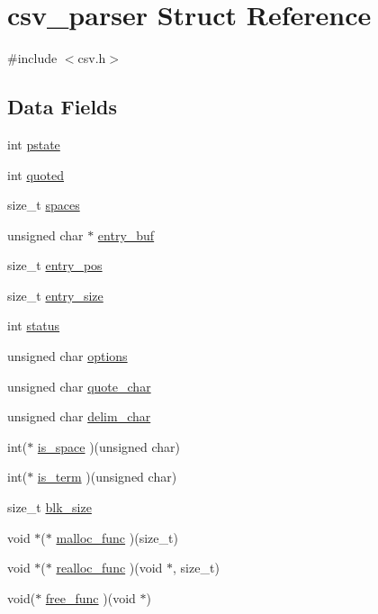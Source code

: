 \hypertarget{structcsv__parser}{}\section{csv\+\_\+parser Struct Reference}
\label{structcsv__parser}


{\ttfamily \#include $<$csv.\+h$>$}

\subsection*{Data Fields}
\begin{DoxyCompactItemize}
\item 
int \hyperlink{structcsv__parser_a57d6eb644698f5567c0511832729881d}{pstate}
\item 
int \hyperlink{structcsv__parser_a17cf94344b659e2d1785109db2028acd}{quoted}
\item 
size\+\_\+t \hyperlink{structcsv__parser_a8285d03865a23548f549a0dafe1639f7}{spaces}
\item 
unsigned char $\ast$ \hyperlink{structcsv__parser_a188bc93ecf5d24ea761c9f152e6e84fb}{entry\+\_\+buf}
\item 
size\+\_\+t \hyperlink{structcsv__parser_a4dafa17fc8952592ad1d7339cec87b0c}{entry\+\_\+pos}
\item 
size\+\_\+t \hyperlink{structcsv__parser_a050339de09565a18f08b217913851295}{entry\+\_\+size}
\item 
int \hyperlink{structcsv__parser_a6e27f49150e9a14580fb313cc2777e00}{status}
\item 
unsigned char \hyperlink{structcsv__parser_aa05f6399318ee41633b822ca07303438}{options}
\item 
unsigned char \hyperlink{structcsv__parser_a065023bbecdc489441e184f5b06463e3}{quote\+\_\+char}
\item 
unsigned char \hyperlink{structcsv__parser_a42bfd1492c290309b8ceca0f42f1901f}{delim\+\_\+char}
\item 
int($\ast$ \hyperlink{structcsv__parser_a84bb1e129be92e0aede2b8f550663e40}{is\+\_\+space} )(unsigned char)
\item 
int($\ast$ \hyperlink{structcsv__parser_a69d7ecb460015723c67157151cdcdc4d}{is\+\_\+term} )(unsigned char)
\item 
size\+\_\+t \hyperlink{structcsv__parser_a365db0540bd9887aec764442d23e5e85}{blk\+\_\+size}
\item 
void $\ast$($\ast$ \hyperlink{structcsv__parser_ac3696e7898d2203393fa88c804f446b9}{malloc\+\_\+func} )(size\+\_\+t)
\item 
void $\ast$($\ast$ \hyperlink{structcsv__parser_a58f8a7d9d7463aad1b63f837a6f86932}{realloc\+\_\+func} )(void $\ast$, size\+\_\+t)
\item 
void($\ast$ \hyperlink{structcsv__parser_aa8cedfd81f841b27885884598e1fafcf}{free\+\_\+func} )(void $\ast$)
\end{DoxyCompactItemize}


